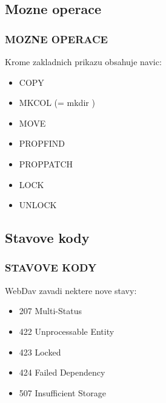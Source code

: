 \documentclass{beamer}
\begin{document}
\subsection{Mozne operace}

\begin{frame}
    \frametitle{MOZNE OPERACE}
Krome zakladnich prikazu obsahuje navic:
    \begin{itemize}
        \item COPY
        \item MKCOL (= mkdir )
        \item MOVE
        \item PROPFIND
        \item PROPPATCH
        \item LOCK
        \item UNLOCK
    \end{itemize}
\end{frame}
\subsection{Stavove kody}

\begin{frame}
    \frametitle{STAVOVE KODY}
WebDav zavadi nektere nove stavy:
    \begin{itemize}
        \item 207 Multi-Status
        \item 422 Unprocessable Entity
        \item 423 Locked
        \item 424 Failed Dependency
        \item 507 Insufficient Storage
    \end{itemize}
\end{frame}
\end{document}
